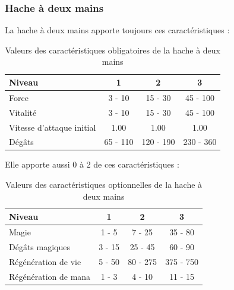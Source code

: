 \documentclass[11pt, a4paper, oneside]{report}
\begin{document}
\subsubsection{Hache à deux mains}
La hache à deux mains apporte toujours ces caractéristiques :
\begin{table}[H]
\begin{center}
\begin{tabular}{| l | c | c | c |}
  \hline      
  Niveau 				& 1 & 2 & 3\\ \hline \hline                 
  Force 				& 3 - 10 & 15 - 30 & 45 - 100\\ \hline
  Vitalité 				& 3 - 10 & 15 - 30 & 45 - 100\\ \hline
  Vitesse d'attaque initial	& 1.00 & 1.00 & 1.00\\ \hline
  Dégâts 				& 65 - 110 & 120 - 190 & 230 - 360\\ \hline
\end{tabular}
\caption{Valeurs des caractéristiques obligatoires de la hache à deux mains}
\end{center}
\end{table}
Elle apporte aussi 0 à 2 de ces caractéristiques :
\begin{table}[H]
\begin{center}
\begin{tabular}{| l | c | c | c |}
  \hline      
  Niveau 				& 1 & 2 & 3\\ \hline \hline
  Magie 				& 1 - 5 & 7 - 25 & 35 - 80\\ \hline
  Dégâts magiques 		& 3 - 15 & 25 - 45 & 60 - 90\\ \hline
  Régénération de vie 	& 5 - 50  & 80 - 275 & 375 - 750\\ \hline
  Régénération de mana 	& 1 - 3  & 4 - 10 & 11 - 15\\ \hline
\end{tabular}
\caption{Valeurs des caractéristiques optionnelles de la hache à deux mains}
\end{center}
\end{table}
\end{document}
